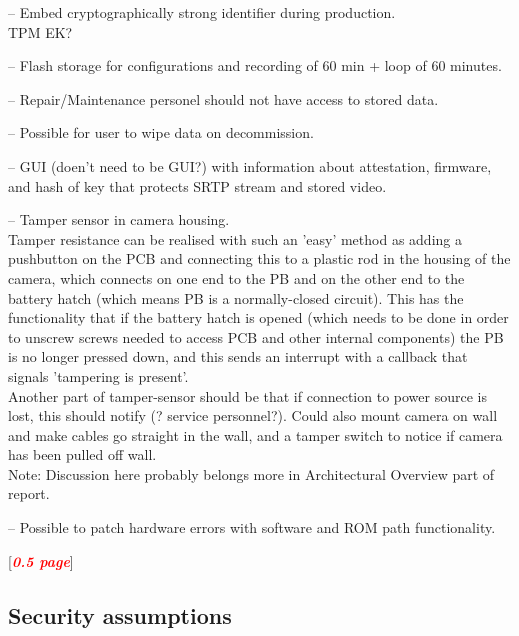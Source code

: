 \documentclass[10pt]{article}
\newcommand{\todo}[1]{
  \begin{center}
    [\textcolor{red}{\textbf{\textit{#1}}}]
  \end{center}
}
\newenvironment{checklist}{%
  \begin{list}{}{}%
  \let\olditem\item
  \renewcommand\item{\olditem -- \marginpar{$\Box$} }
  \newcommand\checkeditem{\olditem -- \marginpar{$\CheckedBox$} }
}{%
  \end{list}
}
\begin{document}
\begin{checklist}
{      }
      \item{Embed cryptographically strong identifier during production. \\
	TPM EK?}
      \item{Flash storage for configurations and recording of 60 min + loop of 60 minutes.}
      \item{Repair/Maintenance personel should not have access to stored data.}
      \item{Possible for user to wipe data on decommission.}
      \item{GUI (doen't need to be GUI?) with information about attestation, firmware, and hash of key
        that protects SRTP stream and stored video.}
      \item{Tamper sensor in camera housing. \\
	Tamper resistance can be realised with such an 'easy' method as adding a pushbutton on the PCB and connecting this to a plastic rod in the housing of the camera,
	which connects on one end to the PB and on the other end to the battery hatch (which means PB is a normally-closed circuit). This has the functionality that if 
	the battery hatch is opened (which needs to be done in order to unscrew screws needed to access PCB and other internal components) 
	the PB is no longer pressed down, and this sends an interrupt with a callback that signals 'tampering is present'. \\
	Another part of tamper-sensor should be that if connection to power source is lost, this should notify (? service personnel?). 
	Could also mount camera on wall and make cables go straight in the wall, and a tamper switch to notice if camera has been pulled off wall.\\
	Note: Discussion here probably belongs more in Architectural Overview part of report.}
      \item{Possible to patch hardware errors with software and ROM path
        functionality.}
    \end{checklist}

    \todo{0.5 page}

    \subsection{Security assumptions}
\end{document}

